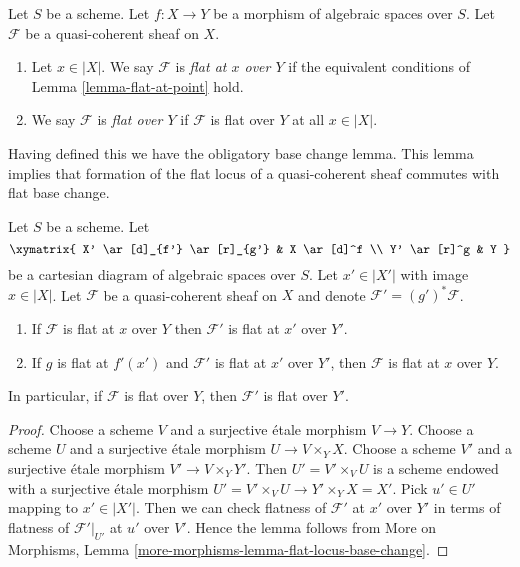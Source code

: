 \begin{definition}
\label{definition-flat-module}
Let $S$ be a scheme.
Let $f : X \to Y$ be a morphism of algebraic spaces over $S$.
Let $\mathcal{F}$ be a quasi-coherent sheaf on $X$.
\begin{enumerate}
\item Let $x \in |X|$. We say $\mathcal{F}$ is {\it flat at $x$ over $Y$}
if the equivalent conditions of
Lemma \ref{lemma-flat-at-point}
hold.
\item We say $\mathcal{F}$ is {\it flat over $Y$} if $\mathcal{F}$ is
flat over $Y$ at all $x \in |X|$.
\end{enumerate}
\end{definition}

\noindent
Having defined this we have the obligatory base change lemma.
This lemma implies that formation of the flat locus of a quasi-coherent
sheaf commutes with flat base change.

\begin{lemma}
\label{lemma-base-change-module-flat}
Let $S$ be a scheme. Let
$$
\xymatrix{
X' \ar[d]_{f'} \ar[r]_{g'} & X \ar[d]^f \\
Y' \ar[r]^g & Y
}
$$
be a cartesian diagram of algebraic spaces over $S$. Let $x' \in |X'|$
with image $x \in |X|$. Let $\mathcal{F}$ be a quasi-coherent
sheaf on $X$ and denote $\mathcal{F}' = (g')^*\mathcal{F}$.
\begin{enumerate}
\item If $\mathcal{F}$ is flat at $x$ over $Y$
then $\mathcal{F}'$ is flat at $x'$ over $Y'$.
\item If $g$ is flat at $f'(x')$ and
$\mathcal{F}'$ is flat at $x'$ over $Y'$, then
$\mathcal{F}$ is flat at $x$ over $Y$.
\end{enumerate}
In particular, if $\mathcal{F}$ is flat over $Y$, then
$\mathcal{F}'$ is flat over $Y'$.
\end{lemma}

\begin{proof}
Choose a scheme $V$ and a surjective \'etale morphism $V \to Y$.
Choose a scheme $U$ and a surjective \'etale morphism $U \to V \times_Y X$.
Choose a scheme $V'$ and a surjective \'etale morphism $V' \to V \times_Y Y'$.
Then $U' = V' \times_V U$ is a scheme endowed with a surjective \'etale
morphism $U' = V' \times_V U \to Y' \times_Y X = X'$. Pick $u' \in U'$
mapping to $x' \in |X'|$. Then we can check flatness of
$\mathcal{F}'$ at $x'$ over $Y'$ in terms of flatness of
$\mathcal{F}'|_{U'}$ at $u'$ over $V'$. Hence the lemma follows from
More on Morphisms, Lemma \ref{more-morphisms-lemma-flat-locus-base-change}.
\end{proof}

